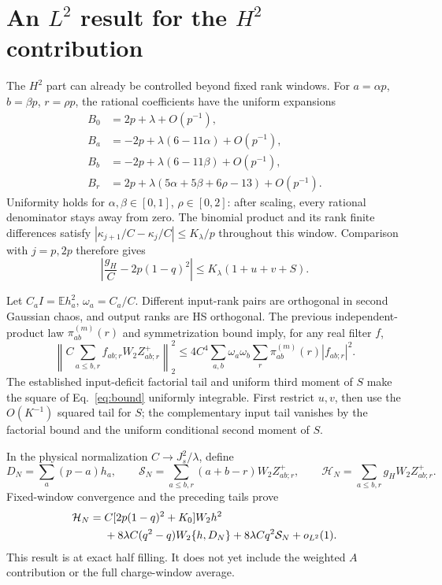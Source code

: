 \documentclass[11pt,a4paper]{article}
\newcommand{\EE}{\mathbb E}
\begin{document}
\newpage
\section{An $L^2$ result for the $H^2$ contribution}
The $H^2$ part can already be controlled beyond fixed rank windows.
For $a=\alpha p$, $b=\beta p$, $r=\rho p$, the rational coefficients
have the uniform expansions
\begin{align}
 B_0&=2p+\lambda+O(p^{-1}),\\
 B_a&=-2p+\lambda(6-11\alpha)+O(p^{-1}),\\
 B_b&=-2p+\lambda(6-11\beta)+O(p^{-1}),\\
 B_r&=2p+\lambda(5\alpha+5\beta+6\rho-13)+O(p^{-1}).
\end{align}
Uniformity holds for $\alpha,\beta\in[0,1]$, $\rho\in[0,2]$:
after scaling, every rational denominator stays away from zero.
The binomial product and its rank finite differences satisfy
$|\kappa_{j+1}/C-\kappa_j/C|\le K_\lambda/p$ throughout this window.
Comparison with $j=p,2p$ therefore gives
\begin{equation}
 \left|\frac{g_H}{C}-2p(1-q)^2\right|
       \le K_\lambda(1+u+v+S).
 \label{eq:bound}
\end{equation}

Let $C_aI=\EE h_a^2$, $\omega_a=C_a/C$. Different input-rank pairs
are orthogonal in second Gaussian chaos, and output ranks are HS
orthogonal. The previous independent-product law $\pi_{ab}^{(m)}(r)$
and symmetrization bound imply, for any real filter $f$,
\begin{equation}
 \left\|C\sum_{a\le b,r} f_{ab;r}W_2Z^+_{ab;r}\right\|_2^2
 \le4C^4\sum_{a,b}\omega_a\omega_b
                  \sum_r\pi_{ab}^{(m)}(r)|f_{ab;r}|^2.
\end{equation}
The established input-deficit factorial tail and uniform third moment
of $S$ make the square of Eq.~\eqref{eq:bound} uniformly integrable.
First restrict $u,v$, then use the $O(K^{-1})$ squared tail for $S$;
the complementary input tail vanishes by the factorial bound and
the uniform conditional second moment of $S$.

In the physical normalization $C\to J_s^2/\lambda$, define
\begin{equation}
 D_N=\sum_a(p-a)h_a,\qquad
 \mathcal S_N=\sum_{a\le b,r}(a+b-r)W_2Z^+_{ab;r},\qquad
 \mathcal H_N=\sum_{a\le b,r}g_HW_2Z^+_{ab;r}.
\end{equation}
Fixed-window convergence and the preceding tails prove
\begin{align}
 \mathcal H_N={}&C[2p(1-q)^2+K_0]W_2h^2\notag\\
 &+8\lambda C(q^2-q)W_2\{h,D_N\}
       +8\lambda Cq^2\mathcal S_N+o_{L^2}(1).
 \label{eq:l2}
\end{align}
This result is at exact half filling. It does not yet include the
weighted $A$ contribution or the full charge-window average.
\end{document}
